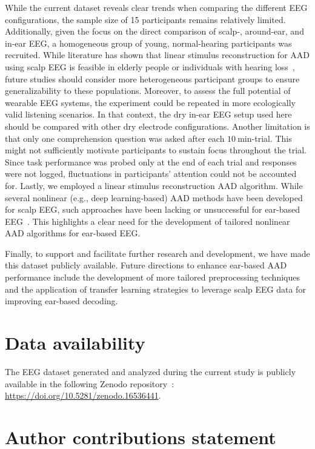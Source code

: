 \documentclass[fleqn,10pt]{wlscirep}
\begin{document}
	While the current dataset reveals clear trends when comparing the different EEG configurations, the sample size of 15 participants remains relatively limited. Additionally, given the focus on the direct comparison of scalp-, around-ear, and in-ear EEG, a homogeneous group of young, normal-hearing participants was recruited. While literature has shown that linear stimulus reconstruction for AAD using scalp EEG is feasible in elderly people or individuals with hearing loss~\cite{fuglsang2020effects}, future studies should consider more heterogeneous participant groups to ensure generalizability to these populations. Moreover, to assess the full potential of wearable EEG systems, the experiment could be repeated in more ecologically valid listening scenarios. In that context, the dry in-ear EEG setup used here should be compared with other dry electrode configurations. Another limitation is that only one comprehension question was asked after each $\SI{10}{\minute}$-trial. This might not sufficiently motivate participants to sustain focus throughout the trial. Since task performance was probed only at the end of each trial and responses were not logged, fluctuations in participants’ attention could not be accounted for. Lastly, we employed a linear stimulus reconstruction AAD algorithm. While several nonlinear (e.g., deep learning-based) AAD methods have been developed for scalp EEG, such approaches have been lacking or unsuccessful for ear-based EEG~\cite{thornton2024comparison}. This highlights a clear need for the development of tailored nonlinear AAD algorithms for ear-based EEG.
	
	Finally, to support and facilitate further research and development, we have made this dataset publicly available. Future directions to enhance ear-based AAD performance include the development of more tailored preprocessing techniques and the application of transfer learning strategies to leverage scalp EEG data for improving ear-based decoding.
	
	\section*{Data availability}
	The EEG dataset generated and analyzed during the current study is publicly available in the following Zenodo repository~\cite{geirnaert2025ear}: \url{https://doi.org/10.5281/zenodo.16536441}.
	
	
	
	\section*{Author contributions statement}
	
\end{document}
